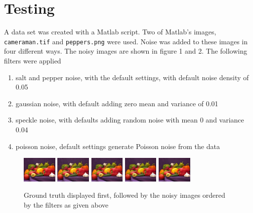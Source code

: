 \documentclass{article}
\begin{document}
\section{Testing}
\label{sec:test}
A data set was created with a Matlab script. Two of Matlab's images,
\texttt{cameraman.tif} and \texttt{peppers.png} were used. Noise was
added to these images in four different ways. The noisy images are
shown in figure 1 and 2. The following filters
were applied
\begin{enumerate}
  \item salt and pepper noise, with the default settings, with
  default noise density of 0.05
  \item gaussian noise, with default adding zero mean and variance
  of 0.01 
  \item speckle noise, with defaults adding random noise with mean 0
  and variance 0.04 
  \item poisson noise, default settings generate Poisson noise from
  the data
\end{enumerate}
%
\begin{figure}[H]
  \centering
  \includegraphics[width=0.15\textwidth]{images/peps_truth}
  \includegraphics[width=0.15\textwidth]{images/peps_noisy1}
  \includegraphics[width=0.15\textwidth]{images/peps_noisy2}
  \includegraphics[width=0.15\textwidth]{images/peps_noisy3}
  \includegraphics[width=0.15\textwidth]{images/peps_noisy4}
  \caption{Ground truth displayed first, followed by the noisy images
    ordered by the filters as given above}
\end{figure}
\end{document}
